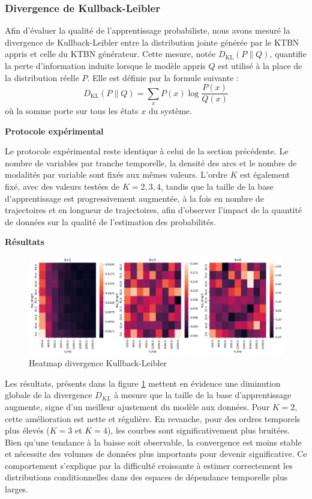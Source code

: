 \documentclass{article}
\begin{document}
\subsubsection{Divergence de Kullback-Leibler}


Afin d'évaluer la qualité de l'apprentissage probabiliste, nous avons mesuré la divergence de Kullback-Leibler
entre la distribution jointe générée par le KTBN appris et celle du KTBN générateur. Cette mesure, notée
\( D_{\mathrm{KL}}(P \parallel Q) \), quantifie la perte d'information induite lorsque le modèle appris \( Q \)
est utilisé à la place de la distribution réelle \( P \). Elle est définie par la formule suivante :
\[
    D_{\mathrm{KL}}(P \parallel Q) = \sum_x P(x) \log \frac{P(x)}{Q(x)}
\]
où la somme porte sur tous les états \( x \) du système.


\textbf{Protocole expérimental}

Le protocole expérimental reste identique à celui de la section précédente. Le nombre de variables par tranche
temporelle, la densité des arcs et le nombre de modalités par variable sont fixés aux mêmes valeurs.
L'ordre $K$ est également fixé, avec des valeurs testées de $K=2,3,4$, tandis que la taille de la base d'apprentissage
est progressivement augmentée, à la fois en nombre de trajectoires et en longueur de trajectoires, afin d'observer
l'impact de la quantité de données sur la qualité de l'estimation des probabilités.

\textbf{Résultats}

\begin{figure}[ht]
    \centering
    \includegraphics[width=\linewidth]{img/klpq.png}
    \caption{Heatmap divergence Kullback-Leibler}
    \label{fig:klpq}
\end{figure}

Les résultats, présents dans la figure \ref{fig:klpq} mettent en évidence une diminution globale de la
divergence $D_{KL}$  à mesure que la taille de la base d'apprentissage augmente, signe d'un meilleur
ajustement du modèle aux données. Pour $K=2$, cette amélioration est nette et régulière. En revanche,
pour des ordres temporels plus élevés ($K=3$ et $K=4$), les courbes sont significativement plus bruitées.
Bien qu'une tendance à la baisse soit observable, la convergence est moins stable et nécessite des volumes de
données plus importants pour devenir significative. Ce comportement s'explique par la difficulté croissante à estimer
correctement les distributions conditionnelles dans des espaces de dépendance temporelle plus larges.
\end{document}
